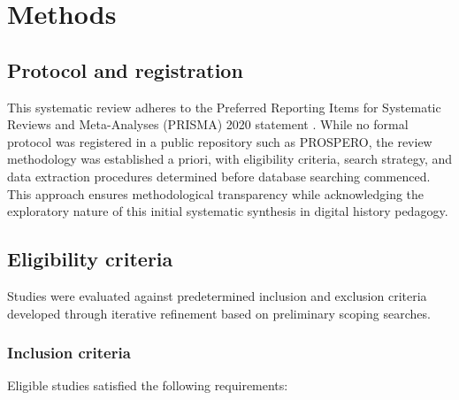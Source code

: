 \documentclass[
hf,
]{ceurart}
\begin{document}
\section{Methods}

\subsection{Protocol and registration}

This systematic review adheres to the Preferred Reporting Items for Systematic Reviews and Meta-Analyses (PRISMA) 2020 statement \cite{Page2021}. While no formal protocol was registered in a public repository such as PROSPERO, the review methodology was established a priori, with eligibility criteria, search strategy, and data extraction procedures determined before database searching commenced. This approach ensures methodological transparency while acknowledging the exploratory nature of this initial systematic synthesis in digital history pedagogy.

\subsection{Eligibility criteria}

Studies were evaluated against predetermined inclusion and exclusion criteria developed through iterative refinement based on preliminary scoping searches.

\subsubsection{Inclusion criteria}

Eligible studies satisfied the following requirements:
\end{document}
